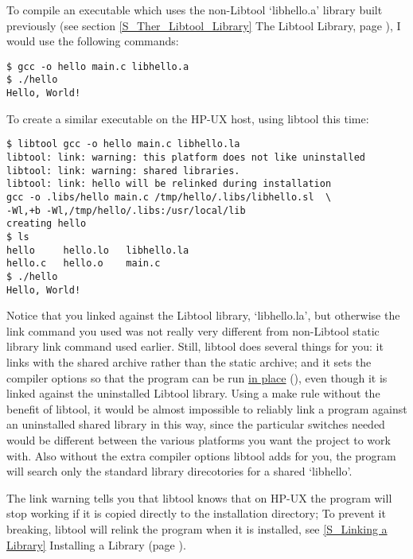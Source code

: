 To compile an executable which uses the non-Libtool `libhello.a' library 
built previously (see section \ref{S_Ther_Libtool_Library} The Libtool Library,
page \pageref{S_Ther_Libtool_Library}), I would use the following commands: 



 

\begin{Verbatim}[frame=single]
$ gcc -o hello main.c libhello.a
$ ./hello
Hello, World!
\end{Verbatim}



To create a similar executable on the HP-UX host, using libtool this time: 



\begin{Verbatim}
$ libtool gcc -o hello main.c libhello.la
libtool: link: warning: this platform does not like uninstalled
libtool: link: warning: shared libraries.
libtool: link: hello will be relinked during installation
gcc -o .libs/hello main.c /tmp/hello/.libs/libhello.sl  \
-Wl,+b -Wl,/tmp/hello/.libs:/usr/local/lib
creating hello
$ ls
hello     hello.lo   libhello.la
hello.c   hello.o    main.c
$ ./hello
Hello, World!
\end{Verbatim}

Notice that you linked against the Libtool library, `libhello.la', but otherwise the link command you used was not really very different from non-Libtool static library link command used earlier. Still, libtool does several things for you: it links with the shared archive rather than the static archive; and it sets the compiler options so that the program can be run \underline{in place} ({\MjQ{}}), even though it is linked against the uninstalled Libtool library. Using a make rule without the benefit of libtool, it would be almost impossible to reliably link a program against an uninstalled shared library in this way, since the particular switches needed would be different between the various platforms you want the project to work with. Also without the extra compiler options libtool adds for you, the program will search only the standard library direcotories for a shared `libhello'. 


The link warning tells you that libtool knows that on HP-UX the program will 
stop working if it is copied directly to the installation directory; To 
prevent it breaking, libtool will relink the program when it is installed,
see \ref{S_Linking a Library} Installing a Library
(page \pageref{S_Linking a Library}). 



